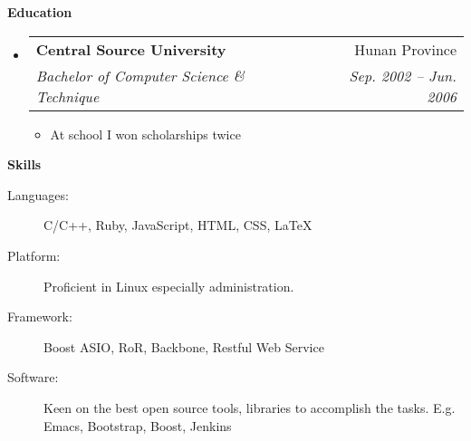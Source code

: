 \documentclass[letterpaper,11pt]{article}
\makeatletter
\newcommand{\resitem}[1]{\item #1 \vspace{-2pt}}
\newcommand{\resheading}[1]{{\large \colorbox{mygrey}{\begin{minipage}{\textwidth}{\textbf{#1 \vphantom{p\^{E}}}}\end{minipage}}}}
\newcommand{\ressubheading}[4]{
\begin{tabular*}{6.5in}{l@{\extracolsep{\fill}}r}
  \textbf{#1} & #2 \\
  \textit{#3} & \textit{#4} \\
\end{tabular*}\vspace{-6pt}}
\makeatother
\begin{document}
\resheading{Education}
\begin{itemize}
\item \ressubheading{Central Source University}{Hunan Province}{%
    Bachelor of Computer Science \& Technique}{Sep. 2002 -- Jun. 2006}

  { \footnotesize
    \begin{itemize}
      \resitem{At school I won scholarships twice}
    \end{itemize}
  }

\end{itemize} %

\resheading{Skills}
  \begin{description}
    \item[Languages:] { \footnotesize C/C++, Ruby, JavaScript, HTML, CSS, \LaTeX }
    \item[Platform:] { \footnotesize Proficient in Linux especially administration. }
    \item[Framework:] { \footnotesize Boost ASIO, RoR, Backbone, Restful Web Service}
    \item[Software:] { \footnotesize Keen on the best open source tools,
          libraries to accomplish the tasks. E.g. Emacs, Bootstrap, Boost, Jenkins }
  \end{description} %
\end{document}
